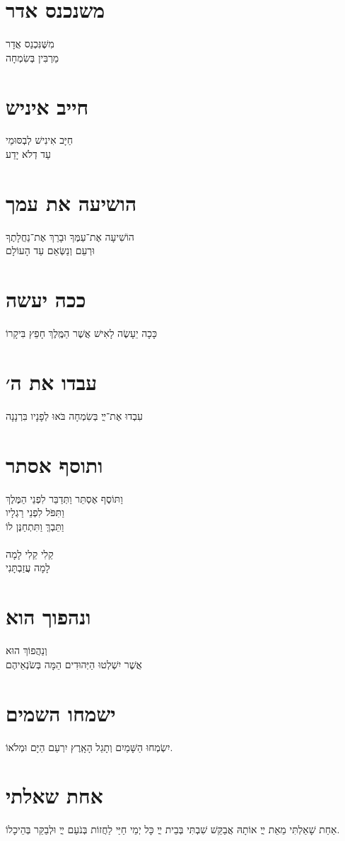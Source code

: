\documentclass{songsheet}
\begin{document}
\pagestyle{plain}
\section{משנכנס אדר}
מִשֶּׁנִּכְנַס אֲדָר \\
מַרְבִּין בְּשִׂמְחָה
\section{חייב איניש}
חַיָּב אִינִישׁ לְבְסּוּמֵי \\
עַד דְלֹא יָדַע
\section{הושיעה את עמך}
הוֹשִׁיעָה אֶת־עַמֶּךָ וּבָרֵךְ אֶת־נַחֲלָתֶךָ \\
וּרְעֵם וְנַשְּׂאֵם עַד הָעוֹלָם
\section{ככה יעשה}
כָּכָה יֵעָשֶׂה לָאִישׁ אֲשֶׁר הַמֶּֽלֶךְ חָפֵץ בִּיקָרוֹ
\section{עבדו את ה׳}
עִבְדוּ אֶת־ײֳ בְּשִׂמְחָה בֹּאוּ לְפָנָיו בִּרְנָנָה
\section{ותוסף אסתר}
וַתּוֹסֶף אֶסְתֵּר וַתְּדַבֵּר
לִפְנֵי הַמֶּלֶךְ \\
וַתִּפֹּל לִפְנֵי רַגְלָיו \\
וַתֵּבְךְּ וַתִּתְחַנֶּן לוֹ \\
\\
קֵלִי קֵלִי לָמָה \\
לָמָה עֲזַבְתָּנִי
\section{ונהפוך הוא}
וְנַהֲפוֹךְ הוּא \\
אֲשֶׁר יִשְׁלְטוּ הַיְּהוּדִים הֵמָּה בְּשֹׂנְאֵיהֶם
\section{ישמחו השמים}
יִשְׂמְחוּ הַשָּׁמַיִם וְתָגֵל הָאָֽרֶץ יִרְעַם הַיָּם וּמְלֹאוֹ.
\section{אחת שאלתי}
אַחַת שָׁאַלְתִּי מֵאֵת ײֳ אוֹתָהּ אֲבַקֵּשׁ שִׁבְתִּי בְּבֵית ײֳ כָּל יְמֵי חַיַּי לַחֲזוֹת בְּנֹעַם ײֳ וּלְבַקֵּר בְּהֵיכָלוֹ.
\end{document}
